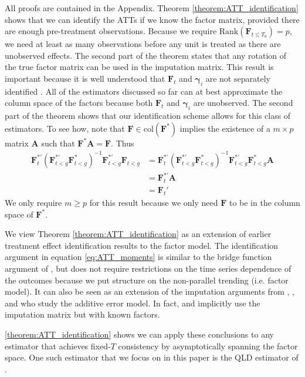 \documentclass[12pt]{article}
\begin{document}
All proofs are contained in the Appendix. Theorem \ref{theorem:ATT_identification} shows that we can identify the ATTs if we know the factor matrix, provided there are enough pre-treatment observations. Because we require $\text{Rank}(\bm F_{t \leq T_0}) = p$, we need at least as many observations before any unit is treated as there are unobserved effects. The second part of the theorem states that any rotation of the true factor matrix can be used in the imputation matrix. This result is important because it is well understood that $\bm{F}_t$ and $\bm{\gamma}_i$ are not separately identified \citep{Bai_2009,Ahn_Lee_Schmidt_2013,xu2017generalized}. All of the estimators discussed so far can at best approximate the column space of the factors because both $\bm{F}_t$ and $\bm \gamma_i$ are unobserved. The second part of the theorem shows that our identification scheme allows for this class of estimators. To see how, note that $\bm F \in \text{col}(\bm F^*)$ implies the existence of a $m \times p$ matrix $\bm A$ such that $\bm F^* \bm A = \bm F$. Thus 
\begin{align*}
    \bm F_t^{*'} \left(\bm F_{t < g}^{*'} \bm F_{t < g}^{*} \right)^{-1} \bm F_{t < g}^{*'} \bm F_{t < g} 
    &= \bm F_t^{*'} \left(\bm F_{t < g}^{*'} \bm F_{t < g}^{*} \right)^{-1} \bm F_{t < g}^{*'} \bm F_{t < g}^* \bm A\\
    &= \bm F_t^{*'} \bm A\\
    &= \bm F_t'
\end{align*}
We only require $m \geq p$ for this result because we only need $\bm F$ to be in the column space of $\bm F^*$. 

We view Theorem \ref{theorem:ATT_identification} as an extension of earlier treatment effect identification results to the factor model. The identification argument in equation \eqref{eq:ATT_moments} is similar to the bridge function argument of \citet{Imbens_Kallus_Mao_2021}, but does not require restrictions on the time series dependence of the outcomes because we put structure on the non-parallel trending (i.e. factor model). It can also be seen as an extension of the imputation arguments from \citet{Gardner_2021}, \citet{Wooldridge_2021}, and \citet{Borusyak_Jaravel_Spiess_2021} who study the additive error model. In fact, \citet{Gardner_2021} and \citet{Borusyak_Jaravel_Spiess_2021} implicitly use the imputation matrix but with known factors. 

\autoref{theorem:ATT_identification} shows we can apply these conclusions to any estimator that achieves fixed-$T$ consistency by asymptotically spanning the factor space. One such estimator that we focus on in this paper is the QLD estimator of \citet{Ahn_Lee_Schmidt_2013}.
\end{document}
